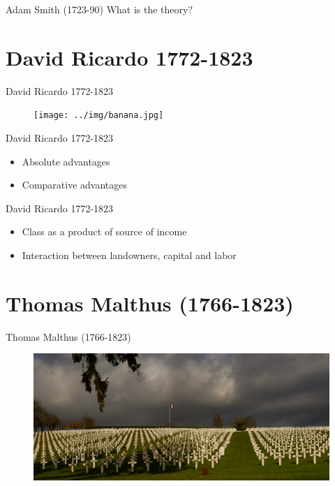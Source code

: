 \documentclass{beamer}
\begin{document}
\begin{frame}{Adam Smith (1723-90)}
What is the theory?
\end{frame}

\section{David Ricardo 1772-1823}
\begin{frame}{David Ricardo 1772-1823}
      \begin{figure}
        \centering
        \texttt{[image: ../img/banana.jpg]}
    \end{figure}  
\end{frame}{}

\begin{frame}{David Ricardo 1772-1823}
    \begin{itemize}[<+- | alert@+>]
    \item Absolute advantages
    \item Comparative advantages
    \end{itemize}
\end{frame}{}

\begin{frame}{David Ricardo 1772-1823}
    \begin{itemize}[<+- | alert@+>]
    \item Class as a product of source of income
    \item Interaction between landowners, capital and labor
    \end{itemize}
\end{frame}{}

\section{Thomas Malthus (1766-1823)}
\begin{frame}{Thomas Malthus (1766-1823)}
      \begin{figure}
        \includegraphics[width=\textwidth, keepaspectratio]{../img/malthus.jpg}
    \end{figure}  
\end{frame}{}
\end{document}
